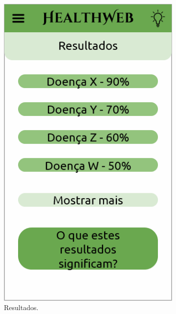 \begin{figure}[htbp]
	\centering
	\begin{subfigure}{0.24\linewidth}
		\centering
		\includegraphics[width=\linewidth]{figure/prototype/mobile/results.png}
		\caption{Resultados.}
		\label{fig:mobile:results}
	\end{subfigure}
	\hfill
	\begin{subfigure}{0.24\linewidth}
		\centering

\end{subfigure}
\end{figure}
